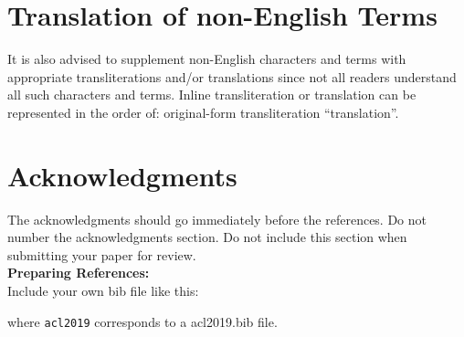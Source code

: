 \documentclass[11pt,a4paper]{article}
\begin{document}
\section{Translation of non-English Terms}

It is also advised to supplement non-English characters and terms
with appropriate transliterations and/or translations
since not all readers understand all such characters and terms.
Inline transliteration or translation can be represented in
the order of: original-form transliteration ``translation''.

\section*{Acknowledgments}

The acknowledgments should go immediately before the references.  Do
not number the acknowledgments section. Do not include this section
when submitting your paper for review. \\

\noindent \textbf{Preparing References:} \\
Include your own bib file like this:
\verb||
\verb|| 

where \verb|acl2019| corresponds to a acl2019.bib file.


\end{document}
